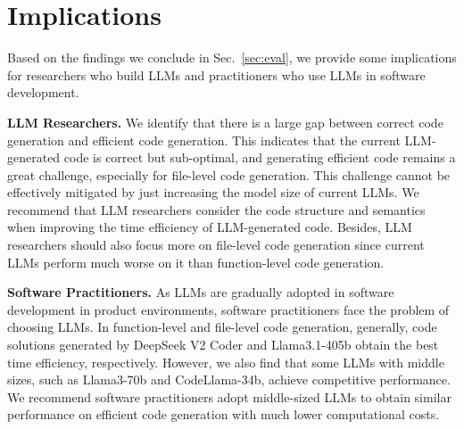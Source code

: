 \section{Implications}

Based on the findings we conclude in Sec.~\ref{sec:eval}, we provide some implications for researchers who build LLMs and practitioners who use LLMs in software development.

\textbf{LLM Researchers.} We identify that there is a large gap between correct code generation and efficient code generation. This indicates that the current LLM-generated code is correct but sub-optimal, and generating efficient code remains a great challenge, especially for file-level code generation. This challenge cannot be effectively mitigated by just increasing the model size of current LLMs. We recommend that LLM researchers consider the code structure and semantics when improving the time efficiency of LLM-generated code. Besides, LLM researchers should also focus more on file-level code generation since current LLMs perform much worse on it than function-level code generation.



\textbf{Software Practitioners.}  As LLMs are gradually adopted in software development in product environments, software practitioners face the problem of choosing LLMs. In function-level and file-level code generation, generally, code solutions generated by DeepSeek V2 Coder and Llama3.1-405b obtain the best time efficiency, respectively. However, we also find that some LLMs with middle sizes, such as Llama3-70b and CodeLlama-34b, achieve competitive performance. We recommend software practitioners adopt middle-sized LLMs to obtain similar performance on efficient code generation with much lower computational costs.